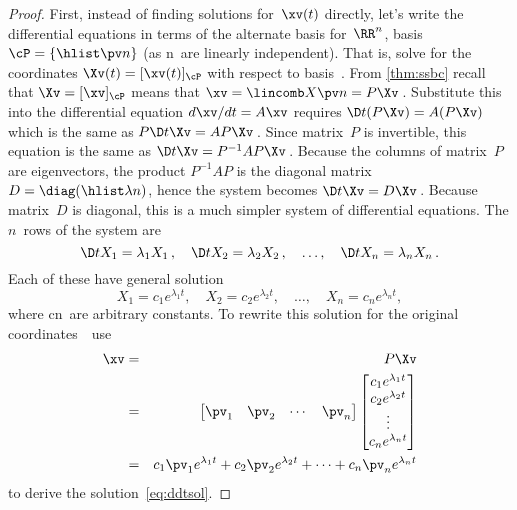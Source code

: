 \begin{proof} 
First, instead of finding solutions for~\(\xv(t)\) directly, let's write the differential equations in terms of the alternate basis for~\(\RR^n\), basis \(\cP=\{\hlist\pv n\}\) (as \hlist\pv n\ are linearly independent).
That is, solve for the coordinates \(\Xv(t)=[\xv(t)]_\cP\) with respect to basis~\cP.
From \autoref{thm:ssbc} recall that  \(\Xv=[\xv]_\cP\) means that \(\xv=\lincomb X\pv n=P\Xv\)\,.
Substitute this into the differential equation \(d\xv/dt=A\xv\) requires \(\D t{}(P\Xv)=A(P\Xv)\) which is the same as \(P\D t\Xv=AP\Xv\)\,.
Since matrix~\(P\) is invertible, this equation is the same as \(\D t\Xv=P^{-1}AP\Xv\)\,.
Because the columns of matrix~\(P\) are eigenvectors, the product \(P^{-1}AP\) is the diagonal matrix \(D=\diag(\hlist\lambda n)\), hence the system becomes \(\D t\Xv=D\Xv\)\,.
Because matrix~\(D\) is diagonal, this is a much simpler system of differential equations.
The \(n\)~rows of the system are
\begin{equation*}
\D t{X_1}=\lambda_1X_1\,,\quad
\D t{X_2}=\lambda_2X_2\,,\quad \ldots,\quad
\D t{X_n}=\lambda_nX_n\,.
\end{equation*}
Each of these have general solution
\begin{equation*}
X_1=c_1e^{\lambda_1t},\quad
X_2=c_2e^{\lambda_2t},\quad \ldots,\quad
X_n=c_ne^{\lambda_nt},
\end{equation*}
where \hlist cn\ are arbitrary constants.
To rewrite this solution for the original coordinates~\xv\ use
\begin{eqnarray*}
\xv&=&P\Xv
\\&=&\begin{bmatrix} \pv_1&\pv_2&\cdots&\pv_n \end{bmatrix}
\begin{bmatrix} c_1e^{\lambda_1t}
\\c_2e^{\lambda_2t}
\\\vdots
\\c_ne^{\lambda_nt} \end{bmatrix}
\\&=&c_1\pv_1e^{\lambda_1t}+c_2\pv_2e^{\lambda_2t}+\cdots+c_n\pv_ne^{\lambda_nt}
\end{eqnarray*}
to derive the solution~\eqref{eq:ddtsol}.


\end{proof}
